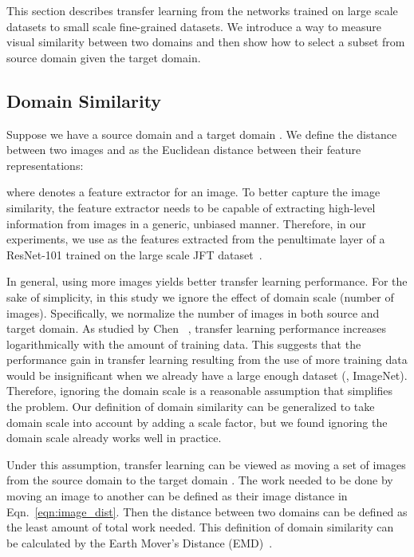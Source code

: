 \documentclass[10pt,twocolumn,letterpaper]{article}
\begin{document}
This section describes transfer learning from the networks trained on large scale datasets to small scale fine-grained datasets.
We introduce a way to measure visual similarity between two domains and then show how to select a subset from source domain given the target domain.


\subsection{Domain Similarity}
\label{sec:domain_similarity}

Suppose we have a source domain  and a target domain .
We define the distance between two images  and  as the Euclidean distance between their feature representations:

where  denotes a feature extractor for an image.
To better capture the image similarity, the feature extractor  needs to be capable of extracting high-level information from images in a generic, unbiased manner.
Therefore, in our experiments, we use  as the features extracted from the penultimate layer of a ResNet-101 trained on the large scale JFT dataset~\cite{revisiting_data}.

In general, using more images yields better transfer learning performance.
For the sake of simplicity, in this study
we ignore the effect of domain scale (number of images).
Specifically, we normalize the number of images in both source and target domain.
As studied by Chen \etal~\cite{revisiting_data}, transfer learning performance increases logarithmically with the amount of training data.
This suggests that the performance gain in transfer learning resulting from the use of more training data would be insignificant when we already have a large enough dataset (\eg, ImageNet).
Therefore, ignoring the domain scale is a reasonable assumption that simplifies the problem.
Our definition of domain similarity can be generalized to take domain scale into account by adding a scale factor, but we found ignoring the domain scale already works well in practice.


Under this assumption, transfer learning can be viewed as moving a set of images from the source domain  to the target domain .
The work needed to be done by moving an image to another can be defined as their image distance in Eqn.\ \ref{eqn:image_dist}.
Then the distance between two domains can be defined as the least amount of total work needed.
This definition of domain similarity can be calculated by the Earth Mover's Distance (EMD)~\cite{emd, emd_2}.
\end{document}

